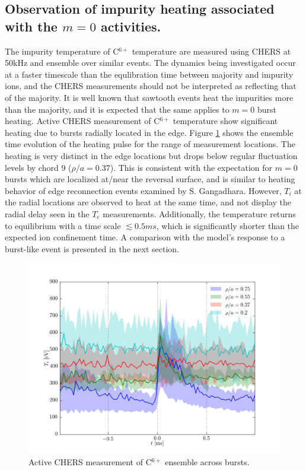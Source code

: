 \begin{refsection}
\section{Observation of impurity heating associated with the $m = 0$ activities.}

The impurity temperature of C$^{6+}$ temperature are measured using CHERS at 50kHz and ensemble over similar events.
The dynamics being investigated occur at a faster timescale than the equlibration time between majority and impurity ions, and the CHERS measurements should not be interpreted as reflecting that of the majority. It is well known that sawtooth events heat the impurities more than the majority\cite{Magee2011}, and it is expected that the same applies to $m = 0$ burst heating.
Active CHERS measurement of C$^{6+}$ temperature show significant heating due to bursts radially located in the edge. Figure \ref{fig:m0_heating} shows the ensemble time evolution of the heating pulse for the range of measurement locations. The heating is very distinct in the edge locations but drops below regular fluctuation levels by chord 9 ($\rho/a = 0.37$). This is consistent with the expectation for $m = 0$ bursts which are localized at/near the reversal surface, and is similar to heating behavior of edge reconnection events examined by S. Gangadhara\cite{Gangadhara2008}. However, $T_i$ at the radial locations are observed to heat at the same time, and not display the radial delay seen in the $T_e$ measurements. Additionally, the temperature returns to equilibrium with a time scale $\lesssim 0.5ms$, which is significantly shorter than the expected ion confinement time. A comparison with the model's response to a burst-like event is presented in the next section.

\begin{figure}
	\centering
	\includegraphics[width = 1.\linewidth]{./m0_and_impurity_heating/burst_heating_c6.png}
	\caption{Active CHERS measurement of C$^{6+}$ ensemble across bursts.}\label{fig:m0_heating}
\end{figure}


\end{refsection}
